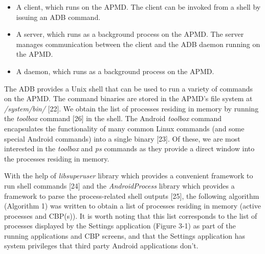 \documentclass[12pt]{uthesis-v12}  %
\begin{document}
			\begin{itemize}
				\item A client, which runs on the APMD. The client can be invoked from a shell by issuing an ADB command.
				\item A server, which runs as a background process on the APMD. The server manages communication between the client and the ADB daemon running on the APMD.
				\item A daemon, which runs as a background process on the APMD.
			\end{itemize}
			
			The ADB provides a Unix shell that can be used to run a variety of commands on the APMD. The command binaries are stored in the APMD's file system at {\em /system/bin/} [22]. We obtain the list of processes residing in memory by running the {\em toolbox} command [26] in the shell. The Android {\em toolbox} command encapsulates the functionality of many common Linux commands (and some special Android commands) into a single binary [23]. Of these, we are most interested in the {\em toolbox} and {\em ps} commands as they provide a direct window into the processes residing in memory. 
			
%			
%			
			With the help of {\em libsuperuser} library which provides a convenient framework to run shell commands [24] and the {\em AndroidProcess} library which provides a framework to parse the process-related shell outputs [25], the following algorithm (Algorithm 1) was written to obtain a list of processes residing in memory (active processes and CBP(s)). It is worth noting that this list corresponds to the list of processes displayed by the Settings application (Figure 3-1) as part of the running applications and CBP screens, and that the Settings application has system privileges that third party Android applications don't.\\ 
			
\end{document}
